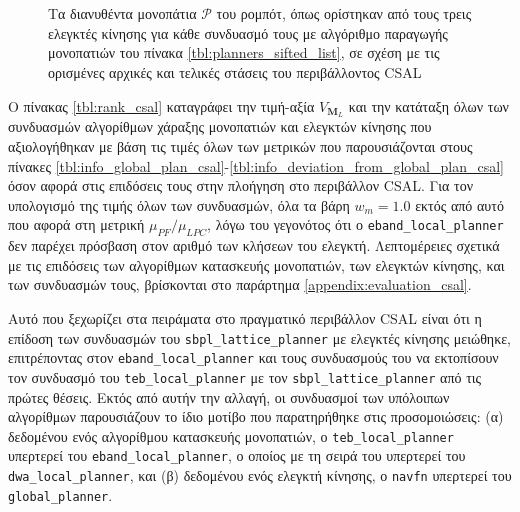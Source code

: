 \begin{figure*}\centering
  \begin{subfigure}[t]{\linewidth}\hspace{-1cm}
    
  \end{subfigure}\\%
  \vspace{-1.5cm}
  \begin{subfigure}[t]{\linewidth}\hspace{-1cm}
    
  \end{subfigure}\\%
  \vspace{-1.5cm}
  \begin{subfigure}[t]{\linewidth}\hspace{-1cm}
    
  \end{subfigure}%
  \caption{\small Τα διανυθέντα μονοπάτια $\bm{\mathcal{P}}$ του ρομπότ, όπως
           ορίστηκαν από τους τρεις ελεγκτές κίνησης για κάθε συνδυασμό τους με
           αλγόριθμο παραγωγής μονοπατιών του πίνακα
           \ref{tbl:planners_sifted_list}, σε σχέση με τις ορισμένες αρχικές και
           τελικές στάσεις του περιβάλλοντος CSAL}
  \label{fig:poses:csal}
\end{figure*}

Ο πίνακας \ref{tbl:rank_csal} καταγράφει την τιμή-αξία $V_{\bm{M}_L}$
και την κατάταξη όλων των συνδυασμών αλγορίθμων χάραξης μονοπατιών και
ελεγκτών κίνησης που αξιολογήθηκαν με βάση τις τιμές όλων των μετρικών που
παρουσιάζονται στους πίνακες
\ref{tbl:info_global_plan_csal}-\ref{tbl:info_deviation_from_global_plan_csal}
όσον αφορά στις επιδόσεις τους στην πλοήγηση στο περιβάλλον CSAL. Για τον
υπολογισμό της τιμής όλων των συνδυασμών, όλα τα βάρη $w_m = 1.0$ εκτός από
αυτό που αφορά στη μετρική $\mu_{PF} / \mu_{LPC}$, λόγω του γεγονότος ότι ο
\texttt{eband\_local\_planner} δεν παρέχει πρόσβαση στον αριθμό των κλήσεων του
ελεγκτή. Λεπτομέρειες σχετικά με τις επιδόσεις των αλγορίθμων κατασκευής
μονοπατιών, των ελεγκτών κίνησης, και των συνδυασμών τους, βρίσκονται στο
παράρτημα \ref{appendix:evaluation_csal}.

Αυτό που ξεχωρίζει στα πειράματα στο πραγματικό περιβάλλον CSAL είναι ότι η
επίδοση των συνδυασμών του \texttt{sbpl\_lattice\_planner} με ελεγκτές κίνησης
μειώθηκε, επιτρέποντας στον \texttt{eband\_local\_planner} και τους συνδυασμούς
του να εκτοπίσουν τον συνδυασμό του \texttt{teb\_local\_planner} με τον
\texttt{sbpl\_lattice\_planner} από τις πρώτες θέσεις. Εκτός από αυτήν την
αλλαγή, οι συνδυασμοί των υπόλοιπων αλγορίθμων παρουσιάζουν το ίδιο μοτίβο που
παρατηρήθηκε στις προσομοιώσεις: (α) δεδομένου ενός αλγορίθμου κατασκευής
μονοπατιών, ο \texttt{teb\_local\_planner} υπερτερεί του
\texttt{eband\_local\_planner}, ο οποίος με τη σειρά του υπερτερεί του
\texttt{dwa\_local\_planner}, και (β) δεδομένου ενός ελεγκτή κίνησης, ο
\texttt{navfn} υπερτερεί του \texttt{global\_planner}.


